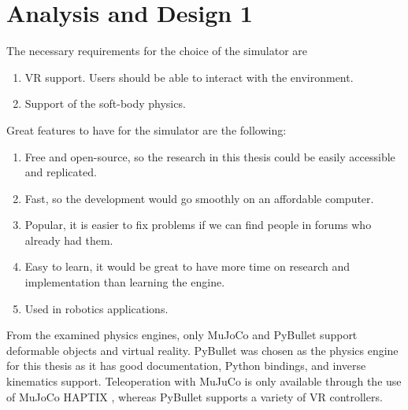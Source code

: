 \section{Analysis and Design 1}

The necessary requirements for the choice of the simulator are
\begin{enumerate}
\item VR support. Users should be able to interact with the environment.
\item Support of the soft-body physics.
\end{enumerate}

\noindent
Great features to have for the simulator are the following:

\begin{enumerate}
\item Free and open-source, so the research in this thesis could be easily accessible and replicated.
\item Fast, so the development would go smoothly on an affordable computer.
\item Popular, it is easier to fix problems if we can find people in forums who already had them.
\item Easy to learn, it would be great to have more time on research and implementation than learning the engine.
\item Used in robotics applications.
\end{enumerate}

\bigskip \noindent
From the examined physics engines, only MuJoCo and PyBullet support deformable objects and virtual reality. PyBullet was chosen as the physics engine for this thesis as it has good documentation, Python bindings, and inverse kinematics support. Teleoperation with MuJuCo is only available through the use of MuJoCo HAPTIX \cite{7363441}, whereas PyBullet supports a variety of VR controllers.

